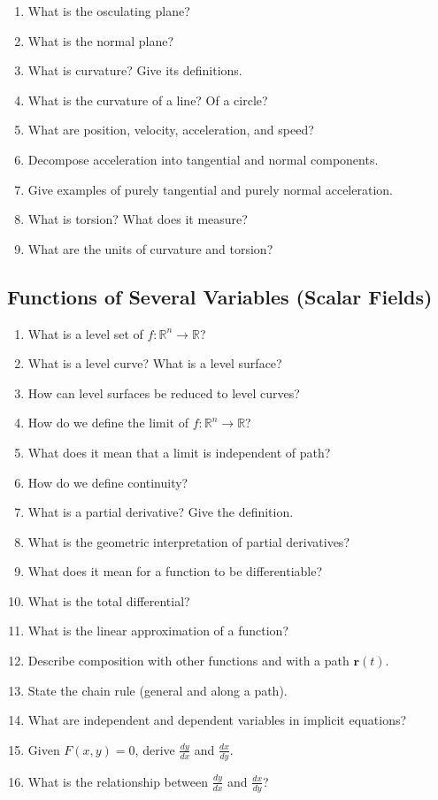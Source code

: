 \begin{enumerate}[resume]
  \item What is the osculating plane?
  \item What is the normal plane?
  \item What is curvature? Give its definitions.
  \item What is the curvature of a line? Of a circle?
  \item What are position, velocity, acceleration, and speed?
  \item Decompose acceleration into tangential and normal components.
  \item Give examples of purely tangential and purely normal acceleration.
  \item What is torsion? What does it measure?
  \item What are the units of curvature and torsion?
\end{enumerate}

\subsection{Functions of Several Variables (Scalar Fields)}

\begin{enumerate}[resume]
  \item What is a level set of $f:\mathbb{R}^n \to \mathbb{R}$?
  \item What is a level curve? What is a level surface?
  \item How can level surfaces be reduced to level curves?
  \item How do we define the limit of $f:\mathbb{R}^n \to \mathbb{R}$?
  \item What does it mean that a limit is independent of path?
  \item How do we define continuity?
  \item What is a partial derivative? Give the definition.
  \item What is the geometric interpretation of partial derivatives?
  \item What does it mean for a function to be differentiable?
  \item What is the total differential?
  \item What is the linear approximation of a function?
  \item Describe composition with other functions and with a path $\mathbf{r}(t)$.
  \item State the chain rule (general and along a path).
  \item What are independent and dependent variables in implicit equations?
  \item Given $F(x,y)=0$, derive $\frac{dy}{dx}$ and $\frac{dx}{dy}$.
  \item What is the relationship between $\frac{dy}{dx}$ and $\frac{dx}{dy}$?
\end{enumerate}


